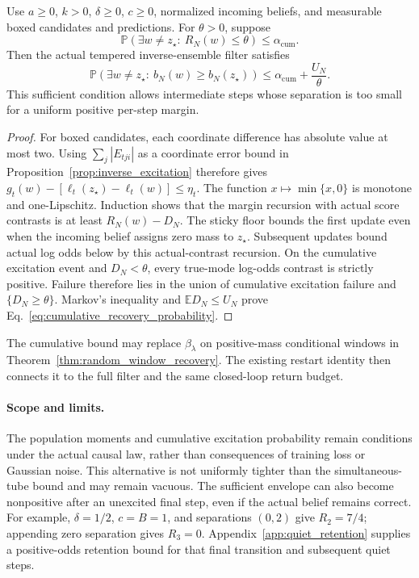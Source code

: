 \begin{theorem}
\label{thm:cumulative_recovery}
Use $a\ge0$, $k>0$, $\delta\ge0$, $c\ge0$, normalized incoming beliefs, and measurable boxed candidates and predictions.
For $\theta>0$, suppose
\begin{equation}
 \mathbb P\!\left(\exists w\ne z_\star:\ R_N(w)\le\theta\right)\le\alpha_{\mathrm{cum}}.
 \label{eq:cumulative_excitation_probability}
\end{equation}
Then the actual tempered inverse-ensemble filter satisfies
\begin{equation}
 \mathbb P\!\left(\exists w\ne z_\star:\ b_N(w)\ge b_N(z_\star)\right)
 \le\alpha_{\mathrm{cum}}+\frac{U_N}{\theta}.
 \label{eq:cumulative_recovery_probability}
\end{equation}
This sufficient condition allows intermediate steps whose separation is too small for a uniform positive per-step margin.
\end{theorem}

\begin{proof}
For boxed candidates, each coordinate difference has absolute value at most two.
Using $\sum_j|E_{tji}|$ as a coordinate error bound in Proposition~\ref{prop:inverse_excitation} therefore gives
$g_t(w)-[\ell_t(z_\star)-\ell_t(w)]\le\eta_t$.
The function $x\mapsto\min\{x,0\}$ is monotone and one-Lipschitz.
Induction shows that the margin recursion with actual score contrasts is at least $R_N(w)-D_N$.
The sticky floor bounds the first update even when the incoming belief assigns zero mass to $z_\star$.
Subsequent updates bound actual log odds below by this actual-contrast recursion.
On the cumulative excitation event and $D_N<\theta$, every true-mode log-odds contrast is strictly positive.
Failure therefore lies in the union of cumulative excitation failure and $\{D_N\ge\theta\}$.
Markov's inequality and $\mathbb E D_N\le U_N$ prove Eq.~\eqref{eq:cumulative_recovery_probability}.
\end{proof}

The cumulative bound may replace $\beta_\lambda$ on positive-mass conditional windows in Theorem~\ref{thm:random_window_recovery}.
The existing restart identity then connects it to the full filter and the same closed-loop return budget.

\paragraph{Scope and limits.}
The population moments and cumulative excitation probability remain conditions under the actual causal law, rather than consequences of training loss or Gaussian noise.
This alternative is not uniformly tighter than the simultaneous-tube bound and may remain vacuous.
The sufficient envelope can also become nonpositive after an unexcited final step, even if the actual belief remains correct.
For example, $\delta=1/2$, $c=B=1$, and separations $(0,2)$ give $R_2=7/4$; appending zero separation gives $R_3=0$.
Appendix~\ref{app:quiet_retention} supplies a positive-odds retention bound for that final transition and subsequent quiet steps.

